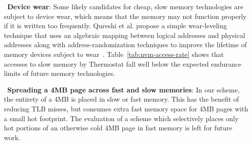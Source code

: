 ~\textbf{Device wear}: Some likely candidates for cheap, slow memory
technologies are subject to device wear, which means that the memory
may not function properly if it is written too frequently. Qureshi et
al. propose a simple wear-leveling technique that uses
an algebraic mapping between logical addresses and physical
addresses along with address-randomization techniques to improve the lifetime of
memory devices subject to wear~\cite{qureshikaridis09}. Table~\ref{tab:nvm-access-rate} shows that
accesses to slow memory by Thermostat fall well below the
expected endurance limits of future memory technologies. 

~\textbf{Spreading a 4MB page across fast and slow memories}: In our scheme, the
entirety of a 4MB is placed in slow or fast memory. This has the benefit of
reducing TLB misses, but consumes extra fast memory space for 4MB pages with a
small hot footprint. The evaluation of a scheme which selectively places only
hot portions of an otherwise cold 4MB page in fast memory is left for future
work.


